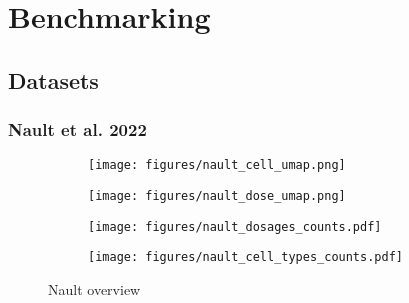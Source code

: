 \chapter{Benchmarking}
\label{ch:chapter1}

\clearpage


\section{Datasets}

\subsection{Nault et al. 2022}

\begin{figure}[h]
    \centering
    \begin{subfigure}[t]{0.49\textwidth}
        \centering
        \texttt{[image: figures/nault\_cell\_umap.png]}
        \caption{}
        \label{fig:figure1}
    \end{subfigure}%
    \hfill
    \begin{subfigure}[t]{0.49\textwidth}
        \centering
        \texttt{[image: figures/nault\_dose\_umap.png]}
        \caption{}
        \label{fig:figure2}
    \end{subfigure}%
    \hfill
    \begin{subfigure}[b]{\textwidth}
        \centering
        \texttt{[image: figures/nault\_dosages\_counts.pdf]}
        \caption{}
        \label{fig:figure3}
    \end{subfigure}
    \hfill
    \begin{subfigure}[b]{\textwidth}
        \centering
        \texttt{[image: figures/nault\_cell\_types\_counts.pdf]}
        \caption{}
        \label{fig:figure4}
    \end{subfigure}    
    \caption{Nault overview}
    \label{fig:combined}
\end{figure}



